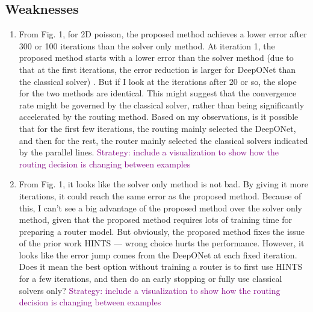 \documentclass[12pt]{article}
\begin{document}
\subsection*{Weaknesses}

\begin{enumerate}
    \item From Fig. 1, for 2D poisson, the proposed method achieves a lower error after 300 or 100 iterations than the solver only method. At iteration 1, the proposed method starts with a lower error than the solver method (due to that at the first iterations, the error reduction is larger for DeepONet than the classical solver) . But if I look at the iterations after 20 or so, the slope for the two methods are identical. This might suggest that the convergence rate might be governed by the classical solver, rather than being significantly accelerated by the routing method. Based on my observations, is it possible that for the first few iterations, the routing mainly selected the DeepONet, and then for the rest, the router mainly selected the classical solvers indicated by the parallel lines. \textcolor{purple}{Strategy: include a visualization to show how the routing decision is changing between examples}
    \item From Fig. 1, it looks like the solver only method is not bad. By giving it more iterations, it could reach the same error as the proposed method. Because of this, I can’t see a big advantage of the proposed method over the solver only method, given that the proposed method requires lots of training time for preparing a router model. But obviously, the proposed method fixes the issue of the prior work HINTS — wrong choice hurts the performance. However, it looks like the error jump comes from the DeepONet at each fixed iteration. Does it mean the best option without training a router is to first use HINTS for a few iterations, and then do an early stopping or fully use classical solvers only? \textcolor{purple}{Strategy: include a visualization to show how the routing decision is changing between examples}
\end{enumerate}
\end{document}
